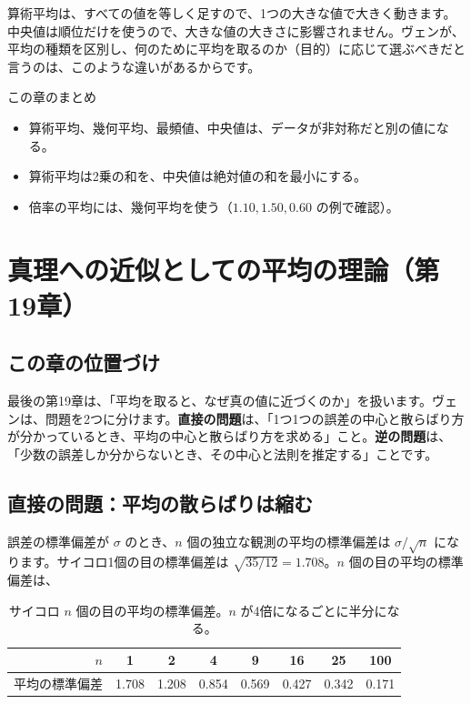 \documentclass[a4paper,11pt,openany]{ltjsbook}
\begin{document}
算術平均は、すべての値を等しく足すので、1つの大きな値で大きく動きます。中央値は順位だけを使うので、大きな値の大きさに影響されません。ヴェンが、平均の種類を区別し、何のために平均を取るのか（目的）に応じて選ぶべきだと言うのは、このような違いがあるからです。

\begin{pointbox}{この章のまとめ}
\begin{itemize}[leftmargin=*]
\item 算術平均、幾何平均、最頻値、中央値は、データが非対称だと別の値になる。
\item 算術平均は2乗の和を、中央値は絶対値の和を最小にする。
\item 倍率の平均には、幾何平均を使う（$1.10,1.50,0.60$ の例で確認）。
\end{itemize}
\end{pointbox}

\chapter{真理への近似としての平均の理論（第19章）}

\section{この章の位置づけ}

最後の第19章は、「平均を取ると、なぜ真の値に近づくのか」を扱います。ヴェンは、問題を2つに分けます。\textbf{直接の問題}は、「1つ1つの誤差の中心と散らばり方が分かっているとき、平均の中心と散らばり方を求める」こと。\textbf{逆の問題}は、「少数の誤差しか分からないとき、その中心と法則を推定する」ことです。

\section{直接の問題：平均の散らばりは縮む}

誤差の標準偏差が $\sigma$ のとき、$n$ 個の独立な観測の平均の標準偏差は $\sigma/\sqrt n$ になります。サイコロ1個の目の標準偏差は $\sqrt{35/12}=1.708$。$n$ 個の目の平均の標準偏差は、

\begin{table}[htbp]
\centering
\begin{tabular}{r|ccccccc}
\toprule
$n$ & 1 & 2 & 4 & 9 & 16 & 25 & 100\\
\midrule
平均の標準偏差 & 1.708 & 1.208 & 0.854 & 0.569 & 0.427 & 0.342 & 0.171\\
\bottomrule
\end{tabular}
\caption{サイコロ $n$ 個の目の平均の標準偏差。$n$ が4倍になるごとに半分になる。}
\end{table}
\end{document}
